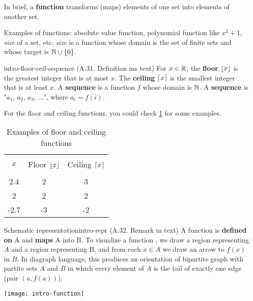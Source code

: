\documentclass[../src/handouts/main.tex]{subfiles}
\begin{document}
In brief, a \textbf{function} transforms (maps) elements of one set into elements of another set.

Examples of functions: absolute value function, polynomial function like $x^2 + 1$, \textit{size} of a set, etc. \textit{size} is a function whose domain is the set of finite sets and whose target is $\mathbb{N} \cup \{0\}$.

\begin{definition}{}{intro-floor-ceil-sequence}
  (A.31. Definition ins text)
  For $x \in \mathbb{R}$, the \textbf{floor} $\lfloor x\rfloor$ is the greatest integer that is at most $x$.
  The \textbf{ceiling} $\lceil x\rceil$ is the smallest integer that is at least $x$.
  A \textbf{sequence} is a function $f$ whose domain is $\mathbb{N}$.
  A \textbf{sequence} is "$a_1,\, a_2,\, a_3,\, \ldots$", where $a_i = f(i)$.
\end{definition}

For the floor and ceiling functions, you could check \cref{table:intro-ex-floor-ceil} for some examples.

\begin{table}[ht]
  \def \gap {\\[-0.5em]}
  \centering
  \begin{tabular}{ccc}
    \hline \gap
    $x$  & Floor $\lfloor x\rfloor$ & Ceiling $\lceil x\rceil$ \gap \\ \hline
    2.4  & 2                 & 3                       \\
    2    & 2                 & 2                       \\
    -2.7 & -3                & -2                      \\ \hline
  \end{tabular}
  \caption{Examples of floor and ceiling functions}
  \label{table:intro-ex-floor-ceil}
\end{table}

\begin{remark}{Schematic representation}{intro-repr}
  (A.32. Remark in text)
  A function  is \textbf{defined on} A and \textbf{maps} A into B.
  To visualize a function , we draw a region representing $A$ and a region representing B, and from each $x \in A$ we draw an arrow to $f(x)$ in $B$.
  In diagraph language, this produces an orientation of bipartite graph with partite sets $A$ and $B$ in which every element of $A$ is the tail of exactly one edge (pair $(a, f(a))$).

  \centering
  \texttt{[image: intro-function]}
\end{remark}
\end{document}
